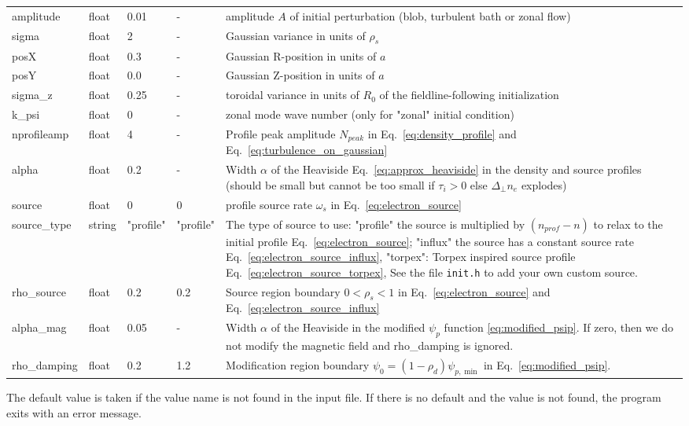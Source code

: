 \begin{longtable}{llll>{\RaggedRight}p{6cm}}
\\
amplitude  & float &0.01   & - & amplitude $A$ of initial perturbation (blob, turbulent bath or zonal flow)  \\
sigma      & float &2      & - & Gaussian variance in units of $\rho_s$ \\
posX       & float &0.3    & - & Gaussian R-position in units of $a$\\
posY       & float &0.0    & - & Gaussian Z-position in units of $a$ \\
sigma\_z    & float &0.25   & - & toroidal variance in units of $R_0$ of the fieldline-following initialization \\
k\_psi     & float &0    & - & zonal mode wave number (only for "zonal" initial condition)  \\
nprofileamp& float &4   & - & Profile peak amplitude $N_{peak}$ in
Eq.~\eqref{eq:density_profile} and Eq.~\eqref{eq:turbulence_on_gaussian}
\\
alpha       & float & 0.2 & - & Width $\alpha$ of the Heaviside
Eq.~\eqref{eq:approx_heaviside} in the density and source profiles (should be
small but cannot be too small if $\tau_i > 0$ else $\Delta_\perp n_e$ explodes)
\\
source      & float & 0    & 0 & profile source rate $\omega_s$ in Eq.~\eqref{eq:electron_source}
\\
source\_type & string & "profile" & "profile" & The type of source to use: "profile" the source is multiplied by $(n_{prof} - n)$ to relax to the initial profile Eq.~\eqref{eq:electron_source};
"influx" the source has a constant source rate Eq.~\eqref{eq:electron_source_influx},
"torpex": Torpex inspired source profile Eq.~\eqref{eq:electron_source_torpex},
    See the file {\tt init.h} to add your own custom source.
\\
rho\_source & float & 0.2  & 0.2 & Source region boundary $0<\rho_{s}<1$ in Eq.~\eqref{eq:electron_source} and Eq.~\eqref{eq:electron_source_influx}  \\
alpha\_mag   & float & 0.05 & - & Width $\alpha$ of the Heaviside in the modified $\psi_p$ function \eqref{eq:modified_psip}. If zero, then we do not modify the magnetic field and rho\_damping is ignored.\\
rho\_damping& float & 0.2  & 1.2 & Modification region boundary $\psi_0 = (1-\rho_d)\psi_{p,\min}$ in Eq.~\eqref{eq:modified_psip}.
\\
\bottomrule
\end{longtable}
The default value is taken if the value name is not found in the input file. If there is no default and
the value is not found,
the program exits with an error message.

